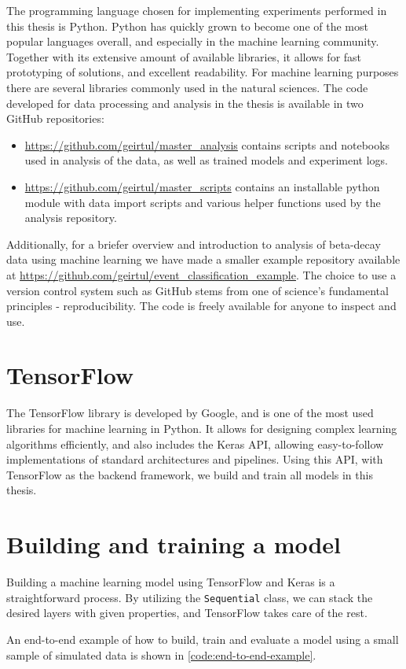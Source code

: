The programming language chosen for implementing experiments performed
in this thesis is Python. Python has quickly grown to become one of the
most popular languages overall, and especially in the machine learning community.
Together with its extensive amount of available libraries, it allows for
fast prototyping of solutions, and excellent readability. For machine learning
purposes there are several libraries commonly used in the natural sciences.
The code developed for data processing and analysis in the thesis is available in two
GitHub repositories:
\begin{itemize}
    \item \url{https://github.com/geirtul/master_analysis}
    contains scripts and notebooks used in analysis of the data, as well as trained
    models and experiment logs.
    \item \url{https://github.com/geirtul/master_scripts}
    contains an installable python module with data import scripts and various helper
    functions used by the analysis repository.
\end{itemize}
Additionally, for a briefer overview and introduction to analysis of beta-decay
data using machine learning we have made a smaller example repository available
at \url{https://github.com/geirtul/event_classification_example}. The choice to use
a version control system such as GitHub stems from one of science's fundamental
principles - reproducibility. The code is freely available for anyone to inspect and
use.

\section{TensorFlow}
The TensorFlow\cite{tensorflow2016} library is developed by Google, and is one of the most
used libraries for machine learning in Python. It allows for designing complex learning
algorithms efficiently, and also includes the Keras API\cite{keras2015}, allowing
easy-to-follow implementations of standard architectures and pipelines. Using this API,
with TensorFlow as the backend framework, we build and train all models in this thesis.

\section{Building and training a model}
Building a machine learning model using TensorFlow and Keras is a straightforward
process. By utilizing the \lstinline{Sequential} class, we can stack the desired layers
with given properties, and TensorFlow takes care of the rest.

An end-to-end example of how to build, train and evaluate a model using
a small sample of simulated data is shown in \ref{code:end-to-end-example}.

